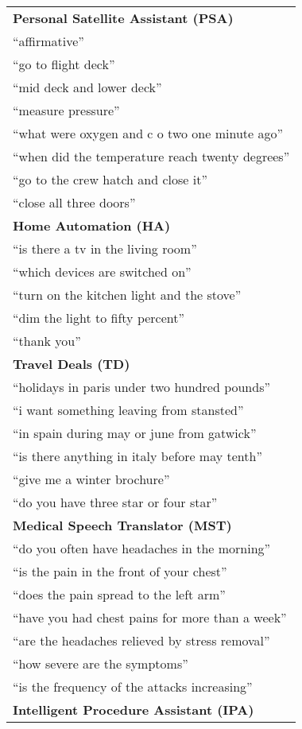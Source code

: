 \documentclass[11pt]{article}
\begin{document}
\begin{table}%
\begin{center}
\begin{tabular}{|l|}
\hline
{\bf Personal Satellite Assistant (PSA)}\\
``affirmative''\\
``go to flight deck''\\
``mid deck and lower deck''\\
``measure pressure''\\ 
``what were oxygen and c o two one minute ago''\\ 
``when did the temperature reach twenty degrees''\\ 
``go to the crew hatch and close it''\\
``close all three doors''\\
\hline
{\bf Home Automation (HA)}\\
``is there a tv in the living room''\\
``which devices are switched on''\\
``turn on the kitchen light and the stove''\\
``dim the light to fifty percent''\\
``thank you''\\
\hline
{\bf Travel Deals (TD)}\\
``holidays in paris under two hundred pounds''\\
``i want something leaving from stansted''\\
``in spain during may or june from gatwick''\\
``is there anything in italy before may tenth''\\
``give me a winter brochure''\\
``do you have three star or four star''\\
\hline
{\bf Medical Speech Translator (MST)}\\
``do you often have headaches in the morning''\\
``is the pain in the front of your chest''\\
``does the pain spread to the left arm''\\
``have you had chest pains for more than a week''\\
``are the headaches relieved by stress removal''\\
``how severe are the symptoms''\\
``is the frequency of the attacks increasing''\\
\hline
{\bf Intelligent Procedure Assistant (IPA)}\\

\end{tabular}
\end{center}
\end{table}
\end{document}
